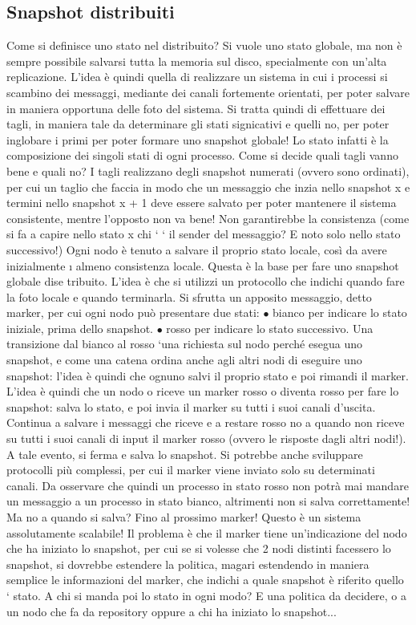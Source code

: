 \subsection{Snapshot distribuiti}
Come si definisce uno stato nel distribuito? Si vuole uno stato globale, ma
non è sempre possibile salvarsi tutta la memoria sul disco, specialmente con
un'alta replicazione. L'idea è quindi quella di realizzare un sistema in cui i
processi si scambino dei messaggi, mediante dei canali fortemente orientati, per
poter salvare in maniera opportuna delle foto del sistema. Si tratta quindi di
effettuare dei tagli, in maniera tale da determinare gli stati signicativi e quelli
no, per poter inglobare i primi per poter formare uno snapshot globale! Lo stato
infatti è la composizione dei singoli stati di ogni processo.
Come si decide quali tagli vanno bene e quali no? I tagli realizzano degli
snapshot numerati (ovvero sono ordinati), per cui un taglio che faccia in modo
che un messaggio che inzia nello snapshot x e termini nello snapshot x + 1 deve
essere salvato per poter mantenere il sistema consistente, mentre l'opposto non
va bene! Non garantirebbe la consistenza (come si fa a capire nello stato x chi
`
` il sender del messaggio? E noto solo nello stato successivo!)
Ogni nodo è tenuto a salvare il proprio stato locale, così da avere inizialmente
\i{}
almeno consistenza locale. Questa è la base per fare uno snapshot globale dise
tribuito. L'idea è che si utilizzi un protocollo che indichi quando fare la foto
locale e quando terminarla. Si sfrutta un apposito messaggio, detto marker, per
cui ogni nodo può presentare due stati:
$\bullet$ bianco per indicare lo stato iniziale, prima dello snapshot.
$\bullet$ rosso per indicare lo stato successivo.
Una transizione dal bianco al rosso `una richiesta sul nodo perché esegua uno
snapshot, e come una catena ordina anche agli altri nodi di eseguire uno snapshot: l'idea è quindi che ognuno salvi il
proprio stato e poi rimandi il marker.
L'idea è quindi che un nodo o riceve un marker rosso o diventa rosso per
fare lo snapshot: salva lo stato, e poi invia il marker su tutti i suoi canali
d'uscita. Continua a salvare i messaggi che riceve e a restare rosso no a quando
non riceve su tutti i suoi canali di input il marker rosso (ovvero le risposte
dagli altri nodi!). A tale evento, si ferma e salva lo snapshot. Si potrebbe
anche sviluppare protocolli più complessi, per cui il marker viene inviato solo
su determinati canali. Da osservare che quindi un processo in stato rosso non
potrà mai mandare un messaggio a un processo in stato bianco, altrimenti non
si salva correttamente!
Ma no a quando si salva? Fino al prossimo marker! Questo è un sistema
assolutamente scalabile! Il problema è che il marker tiene un'indicazione del
nodo che ha iniziato lo snapshot, per cui se si volesse che 2 nodi distinti facessero
lo snapshot, si dovrebbe estendere la politica, magari estendendo in maniera
semplice le informazioni del marker, che indichi a quale snapshot è riferito quello
`
stato. A chi si manda poi lo stato in ogni modo? E una politica da decidere, o
a un nodo che fa da repository oppure a chi ha iniziato lo snapshot...